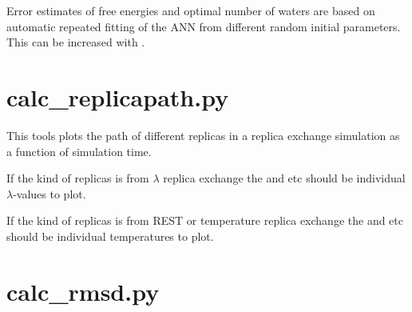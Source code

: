 \documentclass[letterpaper,10pt,english]{sphinxmanual}
\begin{document}
Error estimates of free energies and optimal number of waters are based on automatic repeated fitting of the ANN from different random initial parameters. This can be increased with .


\section{calc\_replicapath.py}
\label{\detokenize{tools:calc-replicapath-py}}

%
\begin{sphinxVerbatim}[commandchars=\\\{\}]
     
        
        
\end{sphinxVerbatim}


This tools plots the path of different replicas in a replica exchange simulation as a function of simulation time.

If the kind of replicas is from \(\lambda\) replica exchange the  and  etc should be individual \(\lambda\)-values to plot.

If the kind of replicas is from REST or temperature replica exchange the  and  etc should be individual temperatures to plot.


\section{calc\_rmsd.py}
\label{\detokenize{tools:calc-rmsd-py}}
\end{document}
